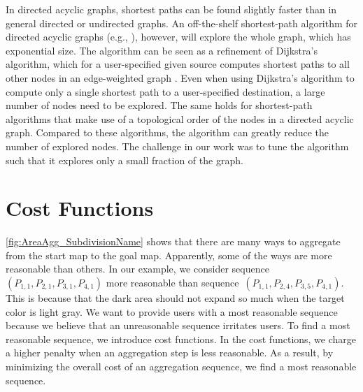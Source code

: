 \documentclass[acmsmall,natbib=false]{acmart}
\begin{document}
In directed acyclic graphs, shortest paths can be found slightly faster 
than in general directed or undirected graphs.
An off-the-shelf shortest-path algorithm for directed acyclic graphs
(e.g., \textcite[]{Cormen2009}),
however, will explore the whole graph, which has exponential size.
The \Astar algorithm can be seen as 
a refinement of Dijkstra's algorithm, 
which for a user-specified given source 
computes shortest paths to all other nodes in an edge-weighted graph
\parencite{Dijkstra1959}. 
Even when using Dijkstra's algorithm 
to compute only a single shortest path to a user-specified destination, 
a large number of nodes need to be explored. 
The same holds for shortest-path algorithms 
that make use of a topological order of the nodes 
in a directed acyclic graph. 
Compared to these algorithms, 
the \Astar algorithm can greatly reduce the number of explored nodes.
The challenge in our work was to tune the \Astar algorithm such that 
it explores only a small fraction of the graph.


\section{Cost Functions}
\label{sec:AreaAgg_CostFunctions}

\fig\ref{fig:AreaAgg_SubdivisionName} shows that there are many 
ways to aggregate from the start map to the goal map.
Apparently, some of the ways are more reasonable than others.
In our example, we consider 
sequence~$(P_{1,1}, P_{2,1},P_{3,1},P_{4,1})$ 
more reasonable than 
sequence~$(P_{1,1}, P_{2,4},P_{3,5},P_{4,1})$.
This is because that the dark area should not expand so much
when the target color is light gray.
We want to provide users with a most reasonable sequence 
because we believe that an unreasonable sequence irritates users.
To find a most reasonable sequence, we introduce cost functions.
In the cost functions, we charge a higher penalty 
when an aggregation step is less reasonable.
As a result, by minimizing the overall cost of an aggregation 
sequence, we find a most reasonable sequence.
\end{document}
